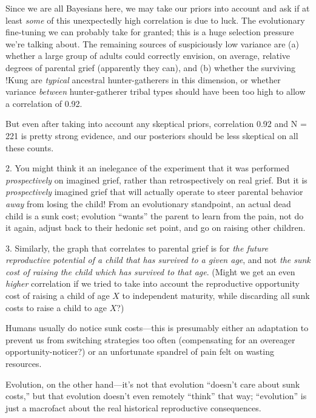 {
 Since we are all Bayesians here, we may take our priors into
account and ask if at least \textit{some} of this unexpectedly high
correlation is due to luck. The evolutionary fine-tuning we can
probably take for granted; this is a huge selection pressure
we're talking about. The remaining sources of
suspiciously low variance are (a) whether a large group of adults could
correctly envision, on average, relative degrees of parental grief
(apparently they can), and (b) whether the surviving !Kung are
\textit{typical} ancestral hunter-gatherers in this dimension, or
whether variance \textit{between} hunter-gatherer tribal types should
have been too high to allow a correlation of 0.92.}

{
 But even after taking into account any skeptical priors,
correlation 0.92 and N = 221 is pretty strong evidence, and our
posteriors should be less skeptical on all these counts.}

{
 2. You might think it an inelegance of the experiment that it was
performed \textit{prospectively} on imagined grief, rather than
retrospectively on real grief. But it is \textit{prospectively}
imagined grief that will actually operate to steer parental behavior
\textit{away} from losing the child! From an evolutionary standpoint,
an actual dead child is a sunk cost; evolution
``wants'' the parent to learn from
the pain, not do it again, adjust back to their hedonic set point, and
go on raising other children.}

{
 3. Similarly, the graph that correlates to parental grief is for
\textit{the future reproductive potential of a child that has survived
to a given age}, and not \textit{the sunk cost of raising the child
which has survived to that age}. (Might we get an even \textit{higher}
correlation if we tried to take into account the reproductive
opportunity cost of raising a child of age $X$ to independent maturity,
while discarding all sunk costs to raise a child to age $X$?)}

{
 Humans usually do notice sunk costs---this is presumably either an
adaptation to prevent us from switching strategies too often
(compensating for an overeager opportunity-noticer?) or an unfortunate
spandrel of pain felt on wasting resources.}

{
 Evolution, on the other hand---it's not that
evolution ``doesn't care about sunk
costs,'' but that evolution doesn't
even remotely ``think'' that way;
``evolution'' is just a macrofact
about the real historical reproductive consequences.}

